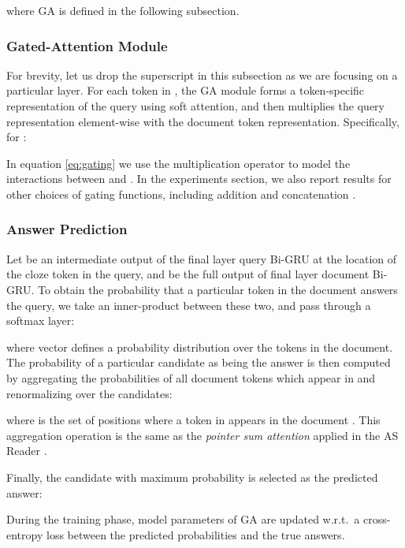 \documentclass[11pt,a4paper]{article}
\begin{document}
where GA is defined in the following subsection.

\subsubsection{Gated-Attention Module}
For brevity,
let us drop the superscript  in this subsection as we are focusing on a particular layer.
For each token  in ,
the GA module forms a token-specific representation of the query  using soft attention, and then multiplies the query representation element-wise with the document token representation. Specifically, for :

In equation \eqref{eq:gating} we use the multiplication operator
to model the interactions between  and .
In the experiments section,
we also report results for other choices of gating functions,
including addition  and concatenation .





\subsubsection{Answer Prediction}
Let  be an intermediate output of the final layer query Bi-GRU at the location  of the cloze token in the query,
and  be the full output of final layer document Bi-GRU. To obtain the probability that a particular token in the document answers the query, we take an inner-product between these two, and pass through a softmax layer:

where vector  defines a probability distribution over the  tokens in the document. The probability of a particular candidate  as being the answer is then computed by aggregating the probabilities of all document tokens which appear in  and renormalizing over the candidates:

where  is the set of positions where a token in  appears in the document . This aggregation operation is the same as the \textit{pointer sum attention} applied in the AS Reader \citep{kadlec2016text}.

Finally, the candidate with maximum probability is selected as the predicted answer:


During the training phase,
model parameters of GA are updated w.r.t.\ a cross-entropy loss between the predicted probabilities and the true answers.
\end{document}

